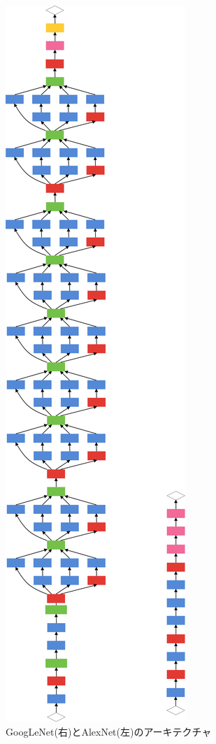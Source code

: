 {\begin{figure}[h]
  \centering
  \includegraphics[scale=0.2]{./chap2/fig/arch_diff.png}
  \caption{GoogLeNet(右)とAlexNet(左)のアーキテクチャ}
  \label{fig:googlenet}
\end{figure}


}
